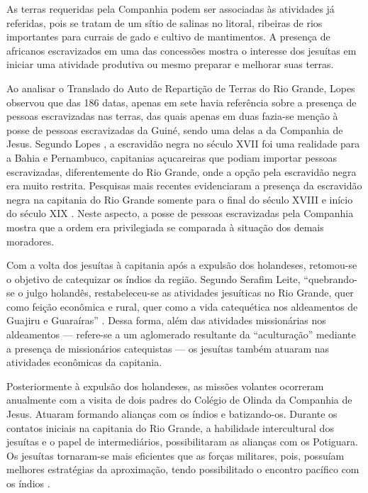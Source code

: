 As terras requeridas pela Companhia podem ser associadas às atividades já referidas, pois se tratam de um sítio de salinas no litoral, ribeiras de rios importantes para currais de gado e cultivo de mantimentos. A presença de africanos escravizados em uma das concessões mostra o interesse dos jesuítas em iniciar uma atividade produtiva ou mesmo preparar e melhorar suas terras.  

Ao analisar o Translado do Auto de Repartição de Terras do Rio Grande, Lopes \citeyear[p.~103]{Lopes2003} observou que das 186 datas, apenas em sete havia referência sobre a presença de pessoas escravizadas nas terras, das quais apenas em duas fazia-se menção à posse de pessoas escravizadas da Guiné, sendo uma delas a da Companhia de Jesus. Segundo Lopes \citeyear[p.~68]{Lopes2003}, a escravidão negra no século XVII foi uma realidade para a Bahia e Pernambuco, capitanias açucareiras que podiam importar pessoas escravizadas, diferentemente do Rio Grande, onde a opção pela escravidão negra era muito restrita. Pesquisas mais recentes evidenciaram a presença da escravidão negra na capitania do Rio Grande somente para o final do século XVIII e início do século XIX \cites{Macedo2007,Souza2013}. Neste aspecto, a posse de pessoas escravizadas pela Companhia mostra que a ordem era privilegiada se comparada à situação dos demais moradores.  

Com a volta dos jesuítas à capitania após a expulsão dos holandeses, retomou-se o objetivo de catequizar os índios da região. Segundo Serafim Leite, “quebrando-se o julgo holandês, restabeleceu-se as atividades jesuíticas no Rio Grande, quer como feição econômica e rural, quer como a vida catequética nos aldeamentos de Guajiru e Guaraíras” \cite[Tombo~V,~p.~370]{Leite2004}. Dessa forma, além das atividades missionárias nos aldeamentos --- refere-se a um aglomerado resultante da “aculturação” mediante a presença de missionários catequistas \cite[p.~39]{Azevedo1957} --- os jesuítas também atuaram nas atividades econômicas da capitania.

Posteriormente à expulsão dos holandeses, as missões volantes ocorreram anualmente com a visita de dois padres do Colégio de Olinda da Companhia de Jesus. Atuaram formando alianças com os índios e batizando-os. Durante os contatos iniciais na capitania do Rio Grande, a habilidade intercultural dos jesuítas e o papel de intermediários, possibilitaram as alianças com os Potiguara. Os jesuítas tornaram-se mais eficientes que as forças militares, pois, possuíam melhores estratégias da aproximação, tendo possibilitado o encontro pacífico com os índios \cite[p.~88]{Porto2000}. 

